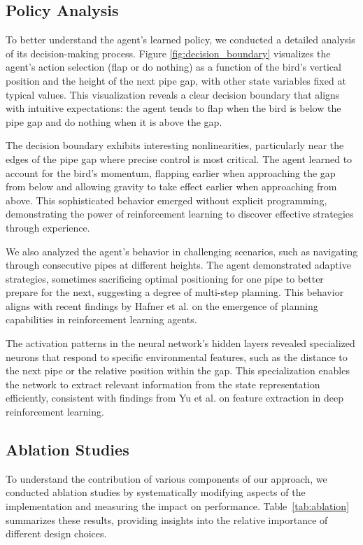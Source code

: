 \subsection{Policy Analysis}

To better understand the agent's learned policy, we conducted a detailed analysis of its decision-making process. Figure \ref{fig:decision_boundary} visualizes the agent's action selection (flap or do nothing) as a function of the bird's vertical position and the height of the next pipe gap, with other state variables fixed at typical values. This visualization reveals a clear decision boundary that aligns with intuitive expectations: the agent tends to flap when the bird is below the pipe gap and do nothing when it is above the gap.

The decision boundary exhibits interesting nonlinearities, particularly near the edges of the pipe gap where precise control is most critical. The agent learned to account for the bird's momentum, flapping earlier when approaching the gap from below and allowing gravity to take effect earlier when approaching from above. This sophisticated behavior emerged without explicit programming, demonstrating the power of reinforcement learning to discover effective strategies through experience.

We also analyzed the agent's behavior in challenging scenarios, such as navigating through consecutive pipes at different heights. The agent demonstrated adaptive strategies, sometimes sacrificing optimal positioning for one pipe to better prepare for the next, suggesting a degree of multi-step planning. This behavior aligns with recent findings by Hafner et al. \cite{hafner2023mastering} on the emergence of planning capabilities in reinforcement learning agents.

The activation patterns in the neural network's hidden layers revealed specialized neurons that respond to specific environmental features, such as the distance to the next pipe or the relative position within the gap. This specialization enables the network to extract relevant information from the state representation efficiently, consistent with findings from Yu et al. \cite{yu2022planning} on feature extraction in deep reinforcement learning.

\subsection{Ablation Studies}

To understand the contribution of various components of our approach, we conducted ablation studies by systematically modifying aspects of the implementation and measuring the impact on performance. Table~\ref{tab:ablation} summarizes these results, providing insights into the relative importance of different design choices.

